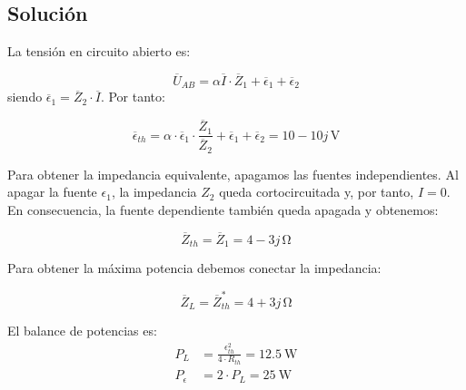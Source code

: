 \subsection*{Solución}

La tensión en circuito abierto es:

\begin{equation*}
  \overline{U}_{AB} = \alpha \overline{I} \cdot \overline{Z}_1 + \overline{\epsilon}_1 + \overline{\epsilon}_2
\end{equation*}
siendo $\overline{\epsilon}_1 = \overline{Z}_2 \cdot \overline{I}$. Por tanto:

\begin{equation*}
  \overline{\epsilon}_{th}  = \alpha \cdot \overline{\epsilon}_1 \cdot \frac{\overline{Z}_1}{\overline{Z}_2} + \overline{\epsilon}_1 + \overline{\epsilon}_2 = 10 - 10j \,\si{\volt}
\end{equation*}

Para obtener la impedancia equivalente, apagamos las fuentes independientes. Al apagar la fuente $\epsilon_1$, la impedancia $Z_2$ queda cortocircuitada y, por tanto, $I = 0$. En consecuencia, la fuente dependiente también queda apagada y obtenemos:

\begin{equation*}
  \overline{Z}_{th} = \overline{Z}_1 = 4 - 3j \,\si{\ohm}
\end{equation*}

Para obtener la máxima potencia debemos conectar la impedancia:

\begin{equation*}
  \overline{Z}_{L} = \overline{Z}^*_{th} = 4 + 3j \,\si{\ohm}
\end{equation*}

El balance de potencias es:
\begin{align*}
  P_L &= \frac{\epsilon_{th}^2}{4 \cdot R_{th}} = \SI{12.5}{\watt}\\
  P_{\epsilon} &= 2 \cdot P_L = \SI{25}{\watt} 
\end{align*}


